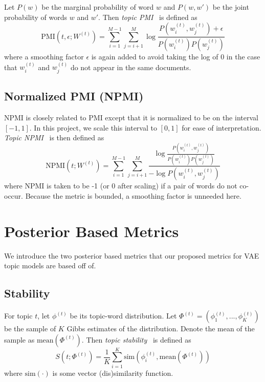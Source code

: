 \documentclass[10pt]{article}
\begin{document}
Let $P(w)$ be the marginal probability of word $w$ and $P(w,w')$ be the joint probability of words $w$ and $w'$. Then \textit{topic PMI}~\cite{Lau:2014} is defined as
\[
\textrm{PMI}\left(t,\epsilon;W^{(t)}\right) = \sum_{i=1}^{M-1}\sum_{j=i+1}^M\log\frac{P\left(w_i^{(t)},w_j^{(t)}\right)+\epsilon}{P\left(w_i^{(t)}\right)P\left(w_j^{(t)}\right)}
\]
where a smoothing factor $\epsilon$ is again added to avoid taking the log of 0 in the case that $w_i^{(t)}$ and $w_j^{(t)}$ do not appear in the same documents.

\subsection{Normalized PMI (NPMI)}

NPMI is closely related to PMI except that it is normalized to be on the interval $[-1,1]$. In this project, we scale this interval to $[0,1]$ for ease of interpretation. \textit{Topic NPMI}~\cite{Lau:2014} is then defined as
\[
\textrm{NPMI}\left(t;W^{(t)}\right) = \sum_{i=1}^{M-1}\sum_{j=i+1}^M\frac{\log\frac{P\left(w_i^{(t)},w_j^{(t)}\right)}{P\left(w_i^{(t)}\right)P\left(w_j^{(t)}\right)}}{-\log P\left(w_i^{(t)},w_j^{(t)}\right)}
\]
where NPMI is taken to be -1 (or 0 after scaling) if a pair of words do not co-occur. Because the metric is bounded, a smoothing factor is unneeded here.

\section{Posterior Based Metrics}\label{sec:posterior}

We introduce the two posterior based metrics that our proposed metrics for VAE topic models are based off of.

\subsection{Stability}

For topic $t$, let $\phi^{(t)}$ be its topic-word distribution. Let $\Phi^{(t)}=\left(\phi_1^{(t)},...,\phi_K^{(t)}\right)$ be the sample of $K$ Gibbs estimates of the distribution. Denote the mean of the sample as $\textrm{mean}\left(\Phi^{(t)}\right)$. Then \textit{topic stability}~\cite{Xing:2018} is defined as
\[
S\left(t;\Phi^{(t)}\right) = \frac{1}{K}\sum_{i=1}^K\textrm{sim}\left(\phi_i^{(t)},\textrm{mean}\left(\Phi^{(t)}\right)\right)
\]
where $\textrm{sim}(\cdot)$ is some vector (dis)similarity function.
\end{document}
